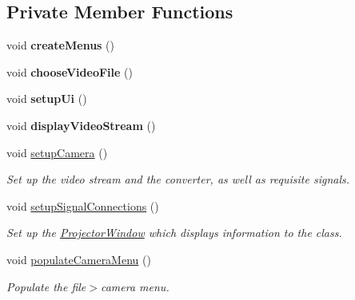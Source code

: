 \subsection*{Private Member Functions}
\begin{DoxyCompactItemize}
\item 
void {\bfseries create\+Menus} ()\hypertarget{classLiveFitWindow_a8b9195c43d88f5b0835fd0e94d9bfdc5}{}\label{classLiveFitWindow_a8b9195c43d88f5b0835fd0e94d9bfdc5}

\item 
void {\bfseries choose\+Video\+File} ()\hypertarget{classLiveFitWindow_a61eaa74b1c86d885823250ac704e9c56}{}\label{classLiveFitWindow_a61eaa74b1c86d885823250ac704e9c56}

\item 
void {\bfseries setup\+Ui} ()\hypertarget{classLiveFitWindow_ac67a35109b6462bc9919d874e92e73bb}{}\label{classLiveFitWindow_ac67a35109b6462bc9919d874e92e73bb}

\item 
void {\bfseries display\+Video\+Stream} ()\hypertarget{classLiveFitWindow_ac78798fbb8ddecd18eced9af51016cf7}{}\label{classLiveFitWindow_ac78798fbb8ddecd18eced9af51016cf7}

\item 
void \hyperlink{classLiveFitWindow_a3a3c6f4aee63ca59231649bfcc075d50}{setup\+Camera} ()
\begin{DoxyCompactList}\small\item\em Set up the video stream and the converter, as well as requisite signals. \end{DoxyCompactList}\item 
void \hyperlink{classLiveFitWindow_aec30ba8f93179f03d6414edd6334826f}{setup\+Signal\+Connections} ()\hypertarget{classLiveFitWindow_aec30ba8f93179f03d6414edd6334826f}{}\label{classLiveFitWindow_aec30ba8f93179f03d6414edd6334826f}

\begin{DoxyCompactList}\small\item\em Set up the \hyperlink{classProjectorWindow}{Projector\+Window} which displays information to the class. \end{DoxyCompactList}\item 
void \hyperlink{classLiveFitWindow_a7a9085bf6b03f1f804526a6e256d9efa}{populate\+Camera\+Menu} ()\hypertarget{classLiveFitWindow_a7a9085bf6b03f1f804526a6e256d9efa}{}\label{classLiveFitWindow_a7a9085bf6b03f1f804526a6e256d9efa}

\begin{DoxyCompactList}\small\item\em Populate the file$>$camera menu. \end{DoxyCompactList}\end{DoxyCompactItemize}
